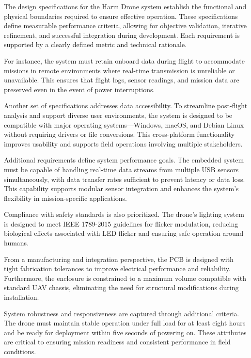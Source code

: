 \documentclass[12pt]{article}
\begin{document}
\par The design specifications for the Harm Drone system establish the functional and physical boundaries required to ensure effective operation. These specifications define measurable performance criteria, allowing for objective validation, iterative refinement, and successful integration during development. Each requirement is supported by a clearly defined metric and technical rationale.

\par For instance, the system must retain onboard data during flight to accommodate missions in remote environments where real-time transmission is unreliable or unavailable. This ensures that flight logs, sensor readings, and mission data are preserved even in the event of power interruptions.

\par Another set of specifications addresses data accessibility. To streamline post-flight analysis and support diverse user environments, the system is designed to be compatible with major operating systems—Windows, macOS, and Debian Linux without requiring drivers or file conversions. This cross-platform functionality improves usability and supports field operations involving multiple stakeholders.

\par Additional requirements define system performance goals. The embedded system must be capable of handling real-time data streams from multiple USB sensors simultaneously, with data transfer rates sufficient to prevent latency or data loss. This capability supports modular sensor integration and enhances the system’s flexibility in mission-specific applications.

\par Compliance with safety standards is also prioritized. The drone’s lighting system is designed to meet IEEE 1789-2015 guidelines for flicker modulation, reducing biological effects associated with LED flicker and ensuring safe operation around humans.

\par From a manufacturing and integration perspective, the PCB is designed with tight fabrication tolerances to improve electrical performance and reliability. Furthermore, the enclosure is constrained to a maximum volume compatible with standard UAV chassis, eliminating the need for structural modifications during installation.

\par System robustness and responsiveness are captured through additional criteria. The drone must maintain stable operation under full load for at least eight hours and be ready for deployment within five seconds of powering on. These attributes are critical to ensuring mission readiness and consistent performance in field conditions.
\end{document}
